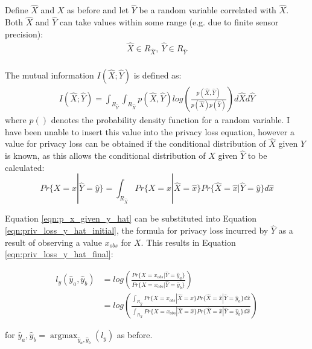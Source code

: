 \documentclass[12pt]{article}
\DeclareMathOperator*{\argmax}{argmax}
\begin{document}
\begin{appendix}
    \\
    \\
    Define $\hat{X}$ and $X$ as before and let $\hat{Y}$ be a random variable correlated with $\hat{X}$. Both $\hat{X}$ and $\hat{Y}$ can take values within some range (e.g. due to finite sensor precision):
    \begin{align*}
      \hat{X} \in R_{\hat{X}},\ \hat{Y} \in R_{\hat{Y}}
    \end{align*}
    \\
    The mutual information $I(\hat{X};\hat{Y})$ is defined as:
    \begin{align}
      I(\hat{X};\hat{Y}) = \int_{R_{\hat{Y}}} \int_{R_{\hat{X}}} p(\hat{X}, \hat{Y}) log \left( \frac{p(\hat{X}, \hat{Y})}{p(\hat{X})p(\hat{Y})} \right) d\hat{X} d\hat{Y}
    \end{align}
    where $p()$ denotes the probability density function for a random variable. I have been unable to insert this value into the privacy loss equation, however a value for privacy loss can be obtained if the conditional distribution of $\hat{X}$ given $\hat{Y}$ is known, as this allows the conditional distribution of $X$ given $\hat{Y}$ to be calculated:
    \begin{equation}
      Pr\{X = x | \hat{Y} = \hat{y}\} = \int_{R_{\hat{X}}}Pr\{X = x | \hat{X} = \hat{x}\} Pr\{\hat{X} = \hat{x} | \hat{Y} = \hat{y}\} d \hat{x} \label{eqn:p_x_given_y_hat}
    \end{equation}

    Equation \ref{eqn:p_x_given_y_hat} can be substituted into Equation \ref{eqn:priv_loss_y_hat_initial}, the formula for privacy loss incurred by $\hat{Y}$ as a result of observing a value $x_{obs}$ for $X$. This results in Equation \ref{eqn:priv_loss_y_hat_final}:

    \begin{align}
      l_y(\hat{y}_a, \hat{y}_b) & = log \left( \frac{Pr\{X = x_{obs} | \hat{Y} = \hat{y}_a\}}{Pr\{X = x_{obs} | \hat{Y} = \hat{y}_b\}} \right) \label{eqn:priv_loss_y_hat_initial} \\
      & = log \left( \frac{\int_{R_{\hat{X}}} Pr\{X = x_{obs}| \hat{X} = \hat{x}\} Pr\{\hat{X}=\hat{x}|\hat{Y} = \hat{y}_a\} d\hat{x} }{\int_{R_{\hat{X}}} Pr\{X = x_{obs}| \hat{X} = \hat{x}\} Pr\{\hat{X}=\hat{x}|\hat{Y} = \hat{y}_b\} d\hat{x} }\right) \label{eqn:priv_loss_y_hat_final}
    \end{align}

    for $\hat{y}_a, \hat{y}_b = \argmax_{\hat{y}_a, \hat{y}_b}(l_y)$ as before.


\end{appendix}
\end{document}
